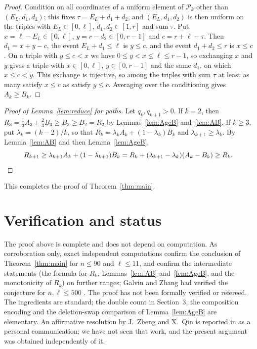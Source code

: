 \documentclass[11pt,a4paper]{amsart}
\theoremstyle{definition}
\theoremstyle{remark}
\begin{document}
\begin{proof}
Condition on all coordinates of a uniform element of $\mathcal P_k$ other than $(E_L,d_1,d_2)$; this fixes $\tau=E_L+d_1+d_2$, and $(E_L,d_1,d_2)$ is then uniform on the triples with $E_L\in[0,\ell]$, $d_1,d_2\in[1,r]$ and sum $\tau$. Put $x=\ell-E_L\in[0,\ell]$, $y=r-d_2\in[0,r-1]$ and $c=r+\ell-\tau$. Then $d_1=x+y-c$, the event $E_L+d_1\le\ell$ is $y\le c$, and the event $d_1+d_2\le r$ is $x\le c$. On a triple with $y\le c<x$ we have $0\le y<x\le\ell\le r-1$, so exchanging $x$ and $y$ gives a triple with $x\in[0,\ell]$, $y\in[0,r-1]$ and the same $d_1$, on which $x\le c<y$. This exchange is injective, so among the triples with sum $\tau$ at least as many satisfy $x\le c$ as satisfy $y\le c$. Averaging over the conditioning gives $A_k\ge B_k$.
\end{proof}

\begin{proof}[Proof of Lemma~\ref{lem:reduce} for paths]
Let $q_k,q_{k+1}>0$. If $k=2$, then $R_3=\tfrac13A_3+\tfrac23B_3\ge B_3\ge B_2=R_2$ by Lemmas~\ref{lem:AgeB} and~\ref{lem:AB}. If $k\ge3$, put $\lambda_k=(k-2)/k$, so that $R_k=\lambda_kA_k+(1-\lambda_k)B_k$ and $\lambda_{k+1}\ge\lambda_k$. By Lemma~\ref{lem:AB} and then Lemma~\ref{lem:AgeB},
\[
R_{k+1}\ge\lambda_{k+1}A_k+(1-\lambda_{k+1})B_k=R_k+(\lambda_{k+1}-\lambda_k)(A_k-B_k)\ge R_k. \qedhere
\]
\end{proof}

This completes the proof of Theorem~\ref{thm:main}.

\section{Verification and status}

The proof above is complete and does not depend on computation. As corroboration only, exact independent computations confirm the conclusion of Theorem~\ref{thm:main} for $n\le 90$ and $\ell\le 11$, and confirm the intermediate statements (the formula for $R_k$, Lemmas~\ref{lem:AB} and~\ref{lem:AgeB}, and the monotonicity of $R_k$) on further ranges; Galvin and Zhang had verified the conjecture for $n,\ell\le500$ \cite{GZ}. The proof has not been formally verified or refereed. The ingredients are standard; the double count in Section~3, the composition encoding and the deletion-swap comparison of Lemma~\ref{lem:AgeB} are elementary. An affirmative resolution by J.~Zheng and X.~Qin is reported in \cite[Section~1]{GZ} as a personal communication; we have not seen that work, and the present argument was obtained independently of it.
\end{document}
